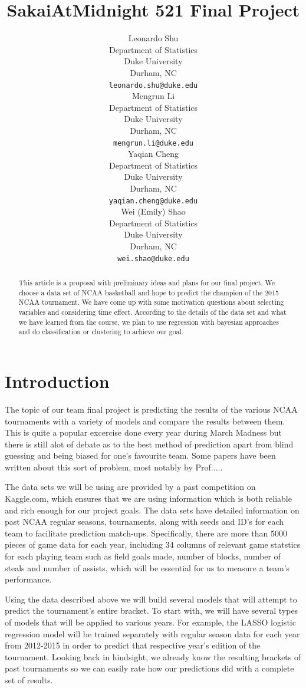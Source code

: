 \documentclass{article} %
\title{SakaiAtMidnight 521 Final Project}
\author{
  Leonardo Shu\\
  Department of Statistics\\
  Duke University\\
  Durham, NC \\
  \texttt{leonardo.shu@duke.edu} \\
  \And
  Mengrun Li \\
  Department of Statistics\\
  Duke University\\
  Durham, NC \\
  \texttt{mengrun.li@duke.edu} \\
  \AND
  Yaqian Cheng \\
  Department of Statistics\\
  Duke University\\
  Durham, NC \\
  \texttt{yaqian.cheng@duke.edu} \\
  \And
  Wei (Emily) Shao \\
  Department of Statistics\\
  Duke University\\
  Durham, NC \\
  \texttt{wei.shao@duke.edu} \\
}
\begin{document}
\maketitle

\begin{abstract}
This article is a proposal with preliminary ideas and plans for our final project. We choose a data set of NCAA basketball and hope to predict the champion of the 2015 NCAA tournament. We have come up with some motivation questions about selecting variables and considering time effect. According to the details of the data set and what we have learned from the course, we plan to use regression with bayesian approaches and do classification or clustering to achieve our goal.
\end{abstract}

\section{Introduction}

The topic of our team final project is predicting the results of the various NCAA tournaments with a variety of models and compare the results between them. This is quite a popular excercise done every year during March Madness but there is still alot of debate as to the best method of prediction apart from blind guessing and being biased for one's favourite team. Some papers have been written about this sort of problem, most notably by Prof.....

The data sets we will be using are provided by a past competition on Kaggle.com, which ensures that we are using information which is both reliable and rich enough for our project goals. The data sets have detailed information on past NCAA regular seasons, tournaments, along with seeds and ID's for each team to facilitate prediction match-ups. Specifically, there are more than 5000 pieces of game data for each year, including 34 columns of relevant game statstics for each playing team such as field goals made, number of blocks, number of steals and number of assists, which will be essential for us to measure a team's performance.

Using the data described above we will build several models that will attempt to predict the tournament's entire bracket. To start with, we will have several types of models that will be applied to various years. For example, the LASSO logistic regression model will be trained separately with regular season data for each year from 2012-2015 in order to predict that respective year's edition of the tournament. Looking back in hindsight, we already know the resulting brackets of past tournaments so we can easily rate how our predictions did with a complete set of results.
\end{document}
